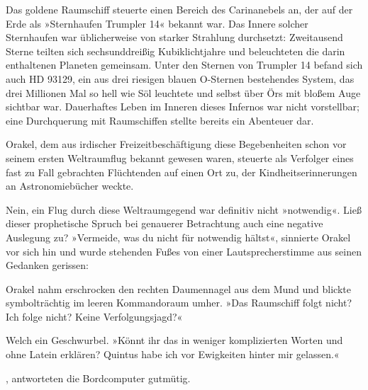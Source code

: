 \cleardoubleevenpage



Das goldene Raumschiff steuerte einen Bereich des Carinanebels an, der auf der Erde als »Sternhaufen Trumpler 14« bekannt war. Das Innere solcher Sternhaufen war üblicherweise von starker Strahlung durchsetzt: Zweitausend Sterne teilten sich sechsunddreißig Kubiklichtjahre und beleuchteten die darin enthaltenen Planeten gemeinsam. Unter den Sternen von Trumpler 14 befand sich auch HD 93129, ein aus drei riesigen blauen O-Sternen bestehendes System, das drei Millionen Mal so hell wie Söl leuchtete und selbst über Örs mit bloßem Auge sichtbar war. Dauerhaftes Leben im Inneren dieses Infernos war nicht vorstellbar; eine Durchquerung mit Raumschiffen stellte bereits ein Abenteuer dar.

Orakel, dem aus irdischer Freizeitbeschäftigung diese Begebenheiten schon vor seinem ersten Weltraumflug bekannt gewesen waren, steuerte als Verfolger eines fast zu Fall gebrachten Flüchtenden auf einen Ort zu, der Kindheitserinnerungen an Astronomiebücher weckte.


Nein, ein Flug durch diese Weltraumgegend war definitiv nicht »notwendig«. Ließ dieser prophetische Spruch bei genauerer Betrachtung auch eine negative Auslegung zu? »Vermeide, was du nicht für notwendig hältst«, sinnierte Orakel vor sich hin und wurde stehenden Fußes von einer Lautsprecherstimme aus seinen Gedanken gerissen:


Orakel nahm erschrocken den rechten Daumennagel aus dem Mund und blickte symbolträchtig im leeren Kommandoraum umher. »Das Raumschiff folgt nicht? Ich folge nicht? Keine Verfolgungsjagd?«


Welch ein Geschwurbel. »Könnt ihr das in weniger komplizierten Worten und ohne Latein erklären? Quintus habe ich vor Ewigkeiten hinter mir gelassen.«

, antworteten die Bordcomputer gutmütig. 

